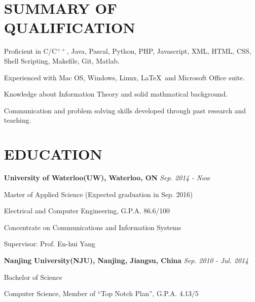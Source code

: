 \documentclass{res}
\newcommand{\parsp}{\vspace{-0.5\baselineskip}}
\newcommand{\additemindent}{\addtolength{\itemindent}{1em}}
\begin{document}
\begin{resume}


\parsp
\section{SUMMARY OF QUALIFICATION}
	\begin{asparaitem}
		\item 	Proficient in C/C$^{++}$, Java, Pascal, Python, PHP, Javascript, XML, HTML, CSS, Shell Scripting, 			Makefile, Git, Matlab.
		\item 	Experienced with Mac OS, Windows, Linux, \LaTeX\  and Microsoft Office suite.
		\item 	Knowledge about Information Theory and solid mathmatical background.
		\item 	Communication and problem solving skills developed through past research and teaching.
	\end{asparaitem}


\parsp
\section{EDUCATION}
	\textbf{University of Waterloo(UW), Waterloo, ON} \hfill \emph{Sep. 2014 - Now}
	\begin{asparaitem}[$\circ$]
		\additemindent
		\item Master of Applied Science (Expected graduation in Sep. 2016) 
		\item Electrical and Computer Engineering, G.P.A. 86.6/100
		\item Concentrate on Communications and Information Systems
		\item Supervisor: Prof. En-hui Yang
  	\end{asparaitem}

  	\vspace{-0.7\baselineskip}

	\textbf{Nanjing University(NJU), Nanjing, Jiangsu, China} \hfill \emph{Sep. 2010 - Jul. 2014}
	\begin{asparaitem}[$\circ$]
		\additemindent
		\item Bachelor of Science
		\item Computer Science, Member of ``Top Notch Plan'', G.P.A. 4.13/5
	\end{asparaitem}



\end{resume}
\end{document}
